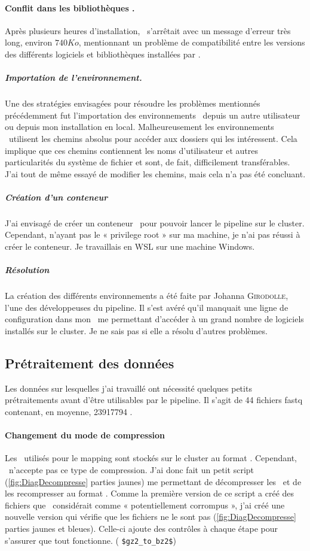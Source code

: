 \documentclass[../main]{subfiles} %
\begin{document}
\paragraph{Conflit dans les bibliothèques \Conda.} Après plusieurs heures d’installation, \Conda s’arrêtait avec un message d’erreur très long, environ $\num{740} Ko$, mentionnant un problème de compatibilité entre les versions des différents logiciels et bibliothèques installées par \Conda.

\subparagraph{Importation de l’environnement.} Une des stratégies envisagées  pour résoudre les problèmes mentionnés précédemment fut l’importation des environnements \Conda depuis un autre utilisateur ou depuis mon installation en local. Malheureusement les environnements \Conda utilisent les chemins absolus pour accéder aux dossiers qui les intéressent. Cela implique que ces chemins contiennent les noms d’utilisateur et autres particularités du système de fichier et sont, de fait, difficilement transférables. J’ai tout de même essayé de modifier les chemins, mais cela n’a pas été concluant.

\subparagraph{Création d’un conteneur \Singularity} J’ai envisagé de créer un conteneur \Singularity pour pouvoir lancer le pipeline sur le \gls{cluster}. Cependant, n’ayant pas le « privilege root » sur ma machine, je n’ai pas réussi à créer le conteneur. Je travaillais en \gls{WSL} sur une machine Windows.

\subparagraph{Résolution} La création des différents environnements a été faite par Johanna \textsc{Girodolle}, l’une des développeuses du pipeline. Il s’est avéré qu’il manquait une ligne de configuration dans mon \bashrc me permettant d’accéder à un grand nombre de logiciels installés sur le \gls{cluster}. Je ne sais pas si elle a résolu d’autres problèmes.


\subsection{Prétraitement des données}
Les données sur lesquelles j’ai travaillé ont nécessité quelques petits prétraitements avant d’être utilisables par le pipeline. Il s'agit de 44 fichiers \gls{fastq} contenant, en moyenne, \num{23 917 794} \reads.

\paragraph{Changement du mode de compression}

Les \fastq utilisés pour le \gls{mapping} sont stockés sur le \gls{cluster} au format \bz. Cependant, \GeCKO n’accepte pas ce type de compression. J’ai donc fait un petit script (\cref{fig:DiagDecompresse} parties jaunes) me permettant de décompresser les \bz et de les recompresser au format \gz. Comme la première version de ce script a créé des fichiers que \GeCKO considérait comme « potentiellement corrompus », j’ai créé une nouvelle version qui vérifie que les fichiers ne le sont pas (\cref{fig:DiagDecompresse} parties jaunes et bleues). Celle-ci ajoute des contrôles à chaque étape pour s’assurer que tout fonctionne.  (\cite{florent_f-marchalm1bioinfointernship2024-inrae_agap_ge2pop_2024} \lstinline{$gz2_to_bz2$})
\end{document}
